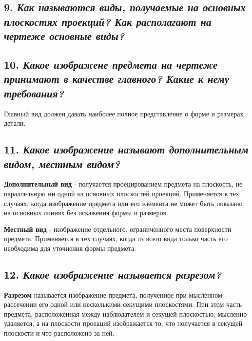 \subsection*{9. \textit{Как называются виды, получаемые на основных плоскостях проекций? Как располагают на чертеже основные виды?}}



\subsection*{10. \textit{Какое изображене предмета на чертеже принимают в качестве главного? Какие к нему требования?}}

Главный вид должен давать наиболее полное представление о форме и размерах детали.
\subsection*{11. \textit{Какое изображение называют дополнительным видом, местным видом?}}

\textbf{Дополнительный вид} - получается проецированием предмета на плоскость, не параллельную ни одной из основных плоскостей проекций. Применяется в тех случаях, когда изображение предмета или его элемента не может быть показано на основных линиях без искажения формы и размеров.

\textbf{Местный вид} - изображение отдельного, ограниченного места поверхности предмета. Применяется в тех случаях, когда из всего вида только часть его необходима для уточнения формы предмета.
\subsection*{12. \textit{Какое изображение называется разрезом?}}

\textbf{Разрезом} называется изображение предмета, полученное при мысленном рассечении его одной или несколькими секущими плоскостями. При этом часть предмета, расположенная между наблюдателем и секущей плоскостью, мысленно удаляется, а на плоскости проекций изображается то, что получается в секущей плоскости и что расположено за ней.

